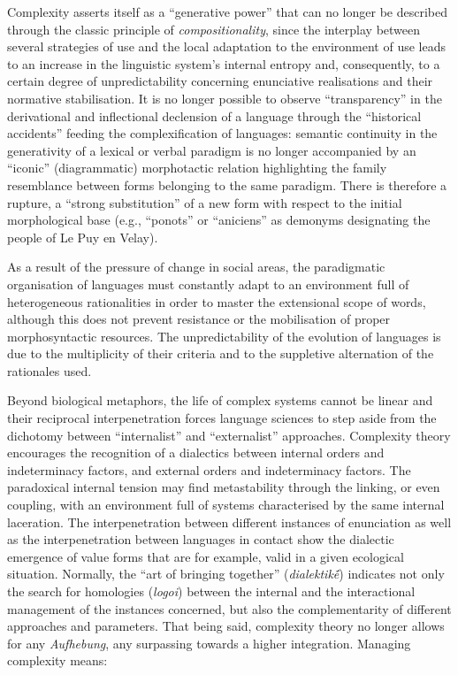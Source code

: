 \documentclass[output=paper]{langscibook}
\begin{document}
Complexity asserts itself as a “generative power” that can no longer be described through the classic principle of \textit{compositionality}, since the interplay between several strategies of use and the local adaptation to the environment of use leads to an increase in the linguistic system’s internal entropy and, consequently, to a certain degree of unpredictability concerning enunciative realisations and their normative stabilisation. It is no longer possible to observe “transparency” in the derivational and inflectional declension of a language through the “historical accidents” feeding the complexification of languages: semantic continuity in the generativity of a lexical or verbal paradigm is no longer accompanied by an “iconic” (diagrammatic) morphotactic relation highlighting the family resemblance between forms belonging to the same paradigm. There is therefore a rupture, a “strong substitution” \citep{Dressler1985} of a new form with respect to the initial morphological base (e.g., “ponots” or “aniciens” as demonyms designating the people of Le Puy en Velay). 

As a result of the pressure of change in social areas, the paradigmatic organisation of languages must constantly adapt to an environment full of heterogeneous rationalities in order to master the extensional scope of words, although this does not prevent resistance or the mobilisation of proper morphosyntactic resources. The unpredictability of the evolution of languages is due to the multiplicity of their criteria and to the suppletive alternation of the rationales used.

Beyond biological metaphors, the life of complex systems cannot be linear and their reciprocal interpenetration forces language sciences to step aside from the dichotomy between “internalist” and “externalist” approaches. Complexity theory encourages the recognition of a dialectics between internal orders and indeterminacy factors, and external orders and indeterminacy factors. The paradoxical internal tension may find metastability through the linking, or even coupling, with an environment full of systems characterised by the same internal laceration. The interpenetration between different instances of enunciation as well as the interpenetration between languages in contact show the dialectic emergence of value forms that are for example, valid in a given ecological situation. Normally, the “art of bringing together” (\textit{dialektikḗ}) indicates not only the search for homologies (\textit{logoi}) between the internal and the interactional management of the instances concerned, but also the complementarity of different approaches and parameters. That being said, complexity theory no longer allows for any \textit{Aufhebung}, any surpassing towards a higher integration. Managing complexity means:\pagebreak
\end{document}
